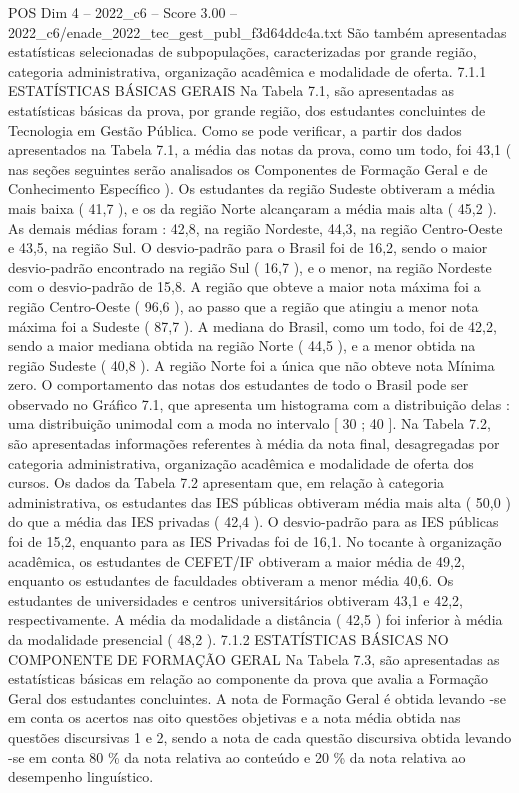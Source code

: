 \begin{textsample}{POS Dim 4 – 2022\_c6 – Score 3.00 – 2022\_c6/enade\_2022\_tec\_gest\_publ\_f3d64ddc4a.txt}
São também apresentadas estatísticas selecionadas de subpopulações, caracterizadas por grande região, categoria administrativa, organização acadêmica e modalidade de oferta. 7.1.1 ESTATÍSTICAS BÁSICAS GERAIS Na Tabela 7.1, são apresentadas as estatísticas básicas da prova, por grande região, dos estudantes concluintes de Tecnologia em Gestão Pública.
Como se pode verificar, a partir dos dados apresentados na Tabela 7.1, a média das notas da prova, como um todo, foi 43,1 ( nas seções seguintes serão analisados os Componentes de Formação Geral e de Conhecimento Específico ).
Os estudantes da região Sudeste obtiveram a média mais baixa ( 41,7 ), e os da região Norte alcançaram a média mais alta ( 45,2 ).
As demais médias foram : 42,8, na região Nordeste, 44,3, na região Centro-Oeste e 43,5, na região Sul.
O desvio-padrão para o Brasil foi de 16,2, sendo o maior desvio-padrão encontrado na região Sul ( 16,7 ), e o menor, na região Nordeste com o desvio-padrão de 15,8.
A região que obteve a maior nota máxima foi a região Centro-Oeste ( 96,6 ), ao passo que a região que atingiu a menor nota máxima foi a Sudeste ( 87,7 ).
A mediana do Brasil, como um todo, foi de 42,2, sendo a maior mediana obtida na região Norte ( 44,5 ), e a menor obtida na região Sudeste ( 40,8 ).
A região Norte foi a única que não obteve nota Mínima zero.
O comportamento das notas dos estudantes de todo o Brasil pode ser observado no Gráfico 7.1, que apresenta um histograma com a distribuição delas : uma distribuição unimodal com a moda no intervalo [ 30 ; 40 ].
Na Tabela 7.2, são apresentadas informações referentes à média da nota final, desagregadas por categoria administrativa, organização acadêmica e modalidade de oferta dos cursos.
Os dados da Tabela 7.2 apresentam que, em relação à categoria administrativa, os estudantes das IES públicas obtiveram média mais alta ( 50,0 ) do que a média das IES privadas ( 42,4 ).
O desvio-padrão para as IES públicas foi de 15,2, enquanto para as IES Privadas foi de 16,1.
No tocante à organização acadêmica, os estudantes de CEFET/IF obtiveram a maior média de 49,2, enquanto os estudantes de faculdades obtiveram a menor média 40,6.
Os estudantes de universidades e centros universitários obtiveram 43,1 e 42,2, respectivamente.
A média da modalidade a distância ( 42,5 ) foi inferior à média da modalidade presencial ( 48,2 ). 7.1.2 ESTATÍSTICAS BÁSICAS NO COMPONENTE DE FORMAÇÃO GERAL Na Tabela 7.3, são apresentadas as estatísticas básicas em relação ao componente da prova que avalia a Formação Geral dos estudantes concluintes.
A nota de Formação Geral é obtida levando -se em conta os acertos nas oito questões objetivas e a nota média obtida nas questões discursivas 1 e 2, sendo a nota de cada questão discursiva obtida levando -se em conta 80 \% da nota relativa ao conteúdo e 20 \% da nota relativa ao desempenho linguístico.

\end{textsample}
